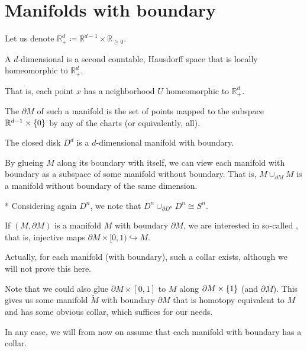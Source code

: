 


\section{Manifolds with boundary}

\begin{notation}
  Let us denote
  $\mathbb{R}^d_{+} \coloneqq \mathbb{R}^{d-1} \times \mathbb{R}_{\geq 0}$.
\end{notation}

\begin{definition}
  A $d$-dimensional 
  is a second countable, Hausdorff space that
  is locally homeomorphic to $\mathbb{R}^d_{+}$.

  That is, each point $x$ has a neighborhood
  $U$ homeomorphic to $\mathbb{R}^d_{+}$.

  The  $\partial M$ of such
  a manifold is the set of points
  mapped to the subspace
  $\mathbb{R}^{d-1} \times \left\{  0  \right\} $ by any
  of the charts (or equivalently, all).
\end{definition}

\begin{example}
  The closed disk $D^d$ is a $d$-dimensional
  manifold with boundary.
\end{example}

\begin{remark}
  By glueing $M$ along its boundary with itself,
  we can view each manifold with boundary
  as a subspace of some manifold without boundary.
  That is, $M \cup _{\partial M} M$ is a manifold
  without boundary of the same dimension.
\end{remark}

\begin{example}*
  Considering again $D^n$, we note that
  $D^n \cup _{\partial D^n} D^n \cong S^n$.
\end{example}

\begin{remark}
  If $(M, \partial M)$ is a manifold $M$
  with boundary $\partial M$,
  we are interested in so-called ,
  that is, injective maps
  $\partial M \times [0,1) \hookrightarrow M$.

  Actually, for each manifold (with boundary),
  such a collar exists, although we will not
  prove this here.

  Note that we could also glue
  $\partial M \times [0,1]$ to $M$
  along $\partial M \times \left\{  1  \right\} $
  (and $\partial M$).
  This gives us some manifold $\tilde{M}$ with
  boundary $\partial M$ that is homotopy
  equivalent to $M$ and has some obvious
  collar, which suffices for our needs.

  In any case, we will from now on assume that
  each manifold with boundary has a collar.
\end{remark}
